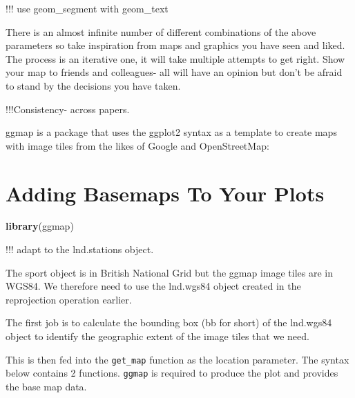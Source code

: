 \documentclass[]{article}
\newenvironment{Shaded}{}{}
\newcommand{\KeywordTok}[1]{\textcolor[rgb]{0.00,0.44,0.13}{\textbf{{#1}}}}
\newcommand{\DecValTok}[1]{\textcolor[rgb]{0.25,0.63,0.44}{{#1}}}
\newcommand{\FloatTok}[1]{\textcolor[rgb]{0.25,0.63,0.44}{{#1}}}
\newcommand{\CommentTok}[1]{\textcolor[rgb]{0.38,0.63,0.69}{\textit{{#1}}}}
\newcommand{\NormalTok}[1]{{#1}}
\begin{document}
!!! use geom\_segment with geom\_text

There is an almost infinite number of different combinations of the
above parameters so take inspiration from maps and graphics you have
seen and liked. The process is an iterative one, it will take multiple
attempts to get right. Show your map to friends and colleagues- all will
have an opinion but don't be afraid to stand by the decisions you have
taken.

!!!Consistency- across papers.

ggmap is a package that uses the ggplot2 syntax as a template to create
maps with image tiles from the likes of Google and OpenStreetMap:

\section{Adding Basemaps To Your Plots}

\begin{Shaded}
\begin{Highlighting}[]
\KeywordTok{library}\NormalTok{(ggmap)}
\end{Highlighting}
\end{Shaded}
!!! adapt to the lnd.stations object.

The sport object is in British National Grid but the ggmap image tiles
are in WGS84. We therefore need to use the lnd.wgs84 object created in
the reprojection operation earlier.

The first job is to calculate the bounding box (bb for short) of the
lnd.wgs84 object to identify the geographic extent of the image tiles
that we need.

\begin{Shaded}
\end{Shaded}
This is then fed into the \texttt{get\_map} function as the location
parameter. The syntax below contains 2 functions. \texttt{ggmap} is
required to produce the plot and provides the base map data.
\end{document}
